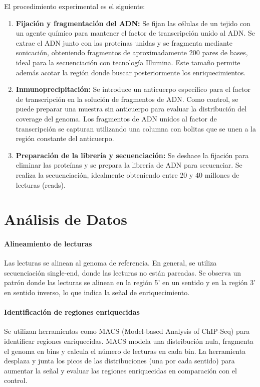 El procedimiento experimental es el siguiente:
\begin{enumerate}
\item \textbf{Fijación y fragmentación del ADN:} Se fijan las células de un tejido con un agente químico para mantener el factor de transcripción unido al ADN. Se extrae el ADN junto con las proteínas unidas y se fragmenta mediante sonicación, obteniendo fragmentos de aproximadamente 200 pares de bases, ideal para la secuenciación con tecnología Illumina. Este tamaño permite además acotar la región donde buscar posteriormente los enriquecimientos.
\item \textbf{Inmunoprecipitación:} Se introduce un anticuerpo específico para el factor de transcripción en la solución de fragmentos de ADN.
Como control, se puede preparar una muestra sin anticuerpo para evaluar la distribución del coverage del genoma.
Los fragmentos de ADN unidos al factor de transcripción se capturan utilizando una columna con bolitas que se unen a la región constante del anticuerpo.
\item \textbf{Preparación de la librería y secuenciación:} Se deshace la fijación para eliminar las proteínas y se prepara la librería de ADN para secuenciar.
Se realiza la secuenciación, idealmente obteniendo entre 20 y 40 millones de lecturas (reads).
\end{enumerate}

\section{Análisis de Datos}
\paragraph{Alineamiento de lecturas}
Las lecturas se alinean al genoma de referencia. En general, se utiliza secuenciación single-end, donde las lecturas no están pareadas.
Se observa un patrón donde las lecturas se alinean en la región 5' en un sentido y en la región 3' en sentido inverso, lo que indica la señal de enriquecimiento.

\paragraph{Identificación de regiones enriquecidas}
Se utilizan herramientas como MACS (Model-based Analysis of ChIP-Seq) para identificar regiones enriquecidas.
MACS modela una distribución nula, fragmenta el genoma en bins y calcula el número de lecturas en cada bin.
La herramienta desplaza y junta los picos de las distribuciones (una por cada sentido) para aumentar la señal y evaluar las regiones enriquecidas en comparación con el control.


